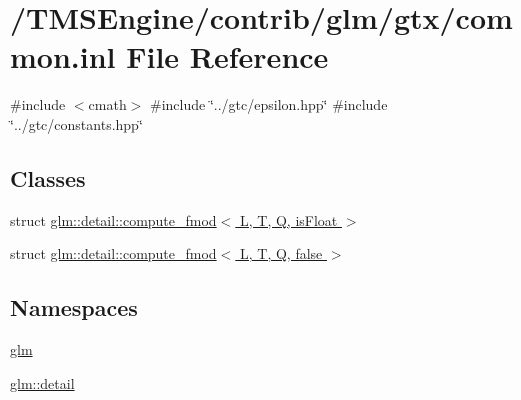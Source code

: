 \hypertarget{common_8inl}{}\section{/\+T\+M\+S\+Engine/contrib/glm/gtx/common.inl File Reference}
\label{common_8inl}
{\ttfamily \#include $<$cmath$>$}\newline
{\ttfamily \#include \char`\"{}../gtc/epsilon.\+hpp\char`\"{}}\newline
{\ttfamily \#include \char`\"{}../gtc/constants.\+hpp\char`\"{}}\newline
\subsection*{Classes}
\begin{DoxyCompactItemize}
\item 
struct \hyperlink{structglm_1_1detail_1_1compute__fmod}{glm\+::detail\+::compute\+\_\+fmod$<$ L, T, Q, is\+Float $>$}
\item 
struct \hyperlink{structglm_1_1detail_1_1compute__fmod_3_01_l_00_01_t_00_01_q_00_01false_01_4}{glm\+::detail\+::compute\+\_\+fmod$<$ L, T, Q, false $>$}
\end{DoxyCompactItemize}
\subsection*{Namespaces}
\begin{DoxyCompactItemize}
\item 
 \hyperlink{namespaceglm}{glm}
\item 
 \hyperlink{namespaceglm_1_1detail}{glm\+::detail}
\end{DoxyCompactItemize}
